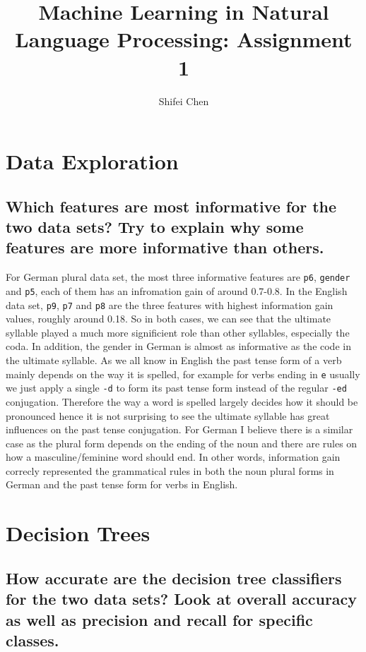 \documentclass[11pt]{article} %
\title{{\LARGE Machine Learning in Natural Language Processing: \newline Assignment 1}\\[1.5mm]} %
\author{Shifei Chen} %
\begin{document}
\maketitle

\section{Data Exploration}

\subsection{Which features are most informative for the two data sets? Try to explain why some features are more informative than others.}

For German plural data set, the most three informative features are \verb|p6|, \verb|gender| and \verb|p5|, each of them has an infromation gain of around 0.7-0.8. In the English data set, \verb|p9|, \verb|p7| and \verb|p8| are the three features with highest information gain values, roughly around 0.18. So in both cases, we can see that the ultimate syllable played a much more significient role than other syllables, especially the coda. In addition, the gender in German is almost as informative as the code in the ultimate syllable. As we all know in English the past tense form of a verb mainly depends on the way it is spelled, for example for verbs ending in \verb|e| usually we just apply a single \verb|-d| to form its past tense form instead of the regular \verb|-ed| conjugation. Therefore the way a word is spelled largely decides how it should be pronounced hence it is not surprising to see the ultimate syllable has great influences on the past tense conjugation. For German I believe there is a similar case as the plural form depends on the ending of the noun and there are rules on how a masculine/feminine word should end. In other words, information gain correcly represented the grammatical rules in both the noun plural forms in German and the past tense form for verbs in English.

\section{Decision Trees}

\subsection{How accurate are the decision tree classifiers for the two data sets? Look at overall accuracy as well as precision and recall for specific classes.}
\end{document}
